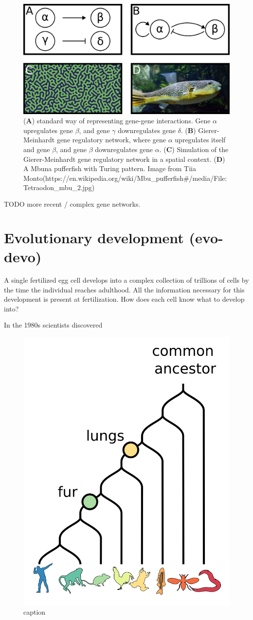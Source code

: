 \begin{figure}[H]
    \includegraphics[width=\linewidth]{ch1.Introduction/imgs/network.png}
    \caption{(\textbf{A}) standard way of representing gene-gene interactions. Gene $\alpha$ upregulates gene $\beta$, and gene $\gamma$ downregulates gene $\delta$. (\textbf{B}) Gierer-Meinhardt gene regulatory network, where gene $\alpha$ upregulates itself and gene $\beta$, and gene $\beta$ downregulates gene $\alpha$. (\textbf{C}) Simulation of the Gierer-Meinhardt gene regulatory network in a spatial context. (\textbf{D}) A Mbuna pufferfish with Turing pattern. Image from Tiia Monto(https://en.wikipedia.org/wiki/Mbu\_pufferfish\#/media/File:Tetraodon\_mbu\_2.jpg)}
    \label{fig:network}
\end{figure}

TODO more recent / complex gene networks. 

\section{Evolutionary development (evo-devo)}

A single fertilized egg cell develops into a complex collection of trillions of cells by the time the individual reaches adulthood. All the information necessary for this development is present at fertilization. How does each cell know what to develop into? 

In the 1980s scientists discovered 

\begin{figure}[H]
    \includegraphics[width=0.5\linewidth]{ch1.Introduction/imgs/phylogeny.png}
    \caption{caption}
    \label{fig:phylogeny}
\end{figure}

